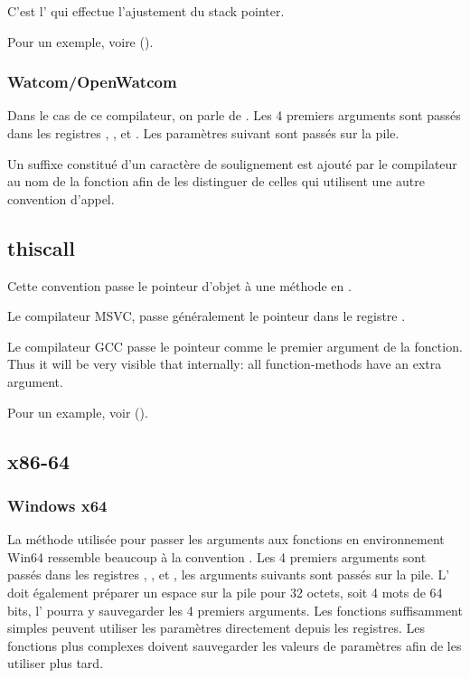 C'est l' qui effectue l'ajustement du \gls{stack pointer}.

Pour un exemple, voire ().

\subsubsection{Watcom/OpenWatcom}

Dans le cas de ce compilateur, on parle de .
Les 4 premiers arguments sont passés dans les registres \EAX, \EDX, \EBX et \ECX.
Les paramètres suivant sont passés sur la pile.

Un suffixe constitué d'un caractère de soulignement est ajouté par le compilateur au nom de la
fonction afin de les distinguer de celles qui utilisent une autre convention d'appel.

\subsection{thiscall}

Cette convention passe le pointeur d'objet \ITthis à une méthode en \Cpp.

Le compilateur MSVC, passe généralement le pointeur \ITthis dans le registre \ECX.

Le compilateur GCC passe le pointeur \ITthis comme le premier argument de la fonction.
Thus it will be very visible that internally: all function-methods have an extra argument.

Pour un example, voir ().

\subsection{x86-64}

\subsubsection{Windows x64}
\label{sec:callingconventions_win64}

La méthode utilisée pour passer les arguments aux fonctions en environnement Win64 ressemble
beaucoup à la convention .
Les 4 premiers arguments sont passés dans les registres \RCX, \RDX,  et ,
les arguments suivants sont passés sur la pile.
L' doit également préparer un espace sur la pile pour 32 octets, soit 4 mots de 64 bits,
l' pourra y sauvegarder les 4 premiers arguments.
Les fonctions suffisamment simples peuvent utiliser les paramètres directement depuis les registres.
Les fonctions plus complexes doivent sauvegarder les valeurs de paramètres afin de les utiliser plus tard.

